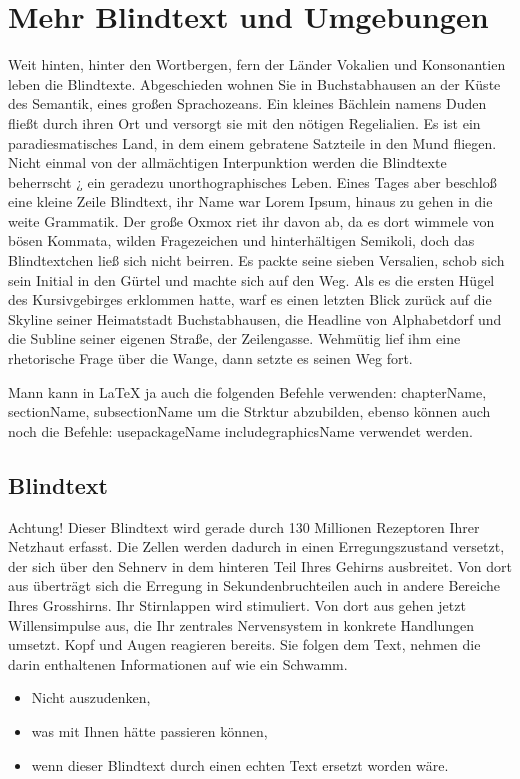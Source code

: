 \documentclass[a4paper,parskip=half,oneside]{scrbook}
\begin{document}
\chapter{Mehr Blindtext und Umgebungen}
Weit hinten, hinter den Wortbergen, fern der Länder Vokalien und Konsonantien leben die Blindtexte. Abgeschieden wohnen Sie in Buchstabhausen an der Küste des Semantik, eines großen Sprachozeans. Ein kleines Bächlein namens Duden fließt durch ihren Ort und versorgt sie mit den nötigen Regelialien. Es ist ein paradiesmatisches Land, in dem einem gebratene Satzteile in den Mund fliegen. Nicht einmal von der allmächtigen Interpunktion werden die Blindtexte beherrscht ¿ ein geradezu unorthographisches Leben. Eines Tages aber beschloß eine kleine Zeile Blindtext, ihr Name war Lorem Ipsum, hinaus zu gehen in die weite Grammatik. Der große Oxmox riet ihr davon ab, da es dort wimmele von bösen Kommata, wilden Fragezeichen und hinterhältigen Semikoli, doch das Blindtextchen ließ sich nicht beirren. Es packte seine sieben Versalien, schob sich sein Initial in den Gürtel und machte sich auf den Weg. Als es die ersten Hügel des Kursivgebirges erklommen hatte, warf es einen letzten Blick zurück auf die Skyline seiner Heimatstadt Buchstabhausen, die Headline von Alphabetdorf und die Subline seiner eigenen Straße, der Zeilengasse. Wehmütig lief ihm eine rhetorische Frage über die Wange, dann setzte es seinen Weg fort. 

Mann kann in LaTeX ja auch die folgenden Befehle verwenden: 
chapter{Name},
section{Name}, 
subsection{Name}
um die Strktur abzubilden, ebenso können auch noch die Befehle:
usepackage{Name}
includegraphics{Name}
verwendet werden.

\section{Blindtext}
Achtung! Dieser Blindtext wird gerade durch 130 Millionen Rezeptoren Ihrer Netzhaut erfasst. Die Zellen werden dadurch in einen Erregungszustand versetzt, der sich über den Sehnerv in dem hinteren Teil Ihres Gehirns ausbreitet. Von dort aus überträgt sich die Erregung in Sekundenbruchteilen auch in andere Bereiche Ihres Grosshirns. Ihr Stirnlappen wird stimuliert. Von dort aus gehen jetzt Willensimpulse aus, die Ihr zentrales Nervensystem in konkrete Handlungen umsetzt. Kopf und Augen reagieren bereits. Sie folgen dem Text, nehmen die darin enthaltenen Informationen auf wie ein Schwamm.

\begin{itemize}
  \item Nicht auszudenken,
  \item was mit Ihnen hätte passieren können,
  \item wenn dieser Blindtext durch einen echten Text ersetzt worden wäre.
\end{itemize}
\end{document}
